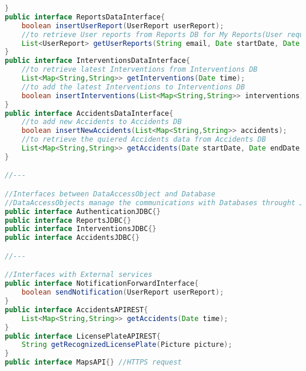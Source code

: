 \documentclass[../../DD.tex]{subfiles}
\begin{document}
\begin{lstlisting}[language=Java]
}
public interface ReportsDataInterface{
	boolean insertUserReport(UserReport userReport);
	//to retrieve User reports from Reports DB for My Reports(User request) and Ticket feedback(Municipality request)
	List<UserReport> getUserReports(String email, Date startDate, Date endDate, String typeOfViolation, Position position, String licensePlate);
}
public interface InterventionsDataInterface{
	//to retrieve latest Interventions from Interventions DB
	List<Map<String,String>> getInterventions(Date time);
	//to add the latest Interventions to Interventions DB
	boolean insertInterventions(List<Map<String,String>> interventions);
}
public interface AccidentsDataInterface{
	//to add new Accidents to Accidents DB
	boolean insertNewAccidents(List<Map<String,String>> accidents);
	//to retrieve the quiered Accidents data from Accidents DB
	List<Map<String,String>> getAccidents(Date startDate, Date endDate, Position position);
}

//---

//Interfaces between DataAccessObject and Database
//DataAccessObjects manage the communications with Databases throught JDBC APIs
public interface AuthenticationJDBC{}
public interface ReportsJDBC{}
public interface InterventionsJDBC{}
public interface AccidentsJDBC{}

//---

//Interfaces with External services
public interface NotificationForwardInterface{
	boolean sendNotification(UserReport userReport);
}
public interface AccidentsAPIREST{
	List<Map<String,String>> getAccidents(Date time);
}
public interface LicensePlateAPIREST{
	String getRecognizedLicensePlate(Picture picture);
}
public interface MapsAPI{} //HTTPS request

\end{lstlisting}


\newpage
\end{document}
